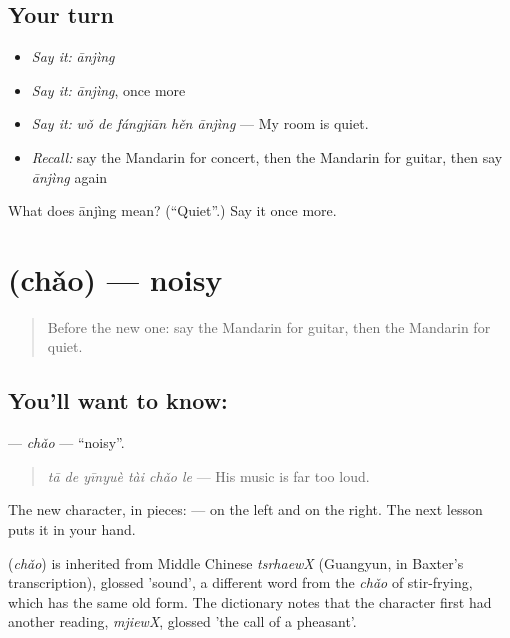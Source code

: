 \subsection*{Your turn}
\begin{itemize}
\raggedright
  \item \emph{Say it:} \emph{ānjìng}
  \item \emph{Say it:} \emph{ānjìng}, once more
  \item \emph{Say it:} \emph{wǒ de fángjiān hěn ānjìng} — My room is quiet.
  \item \emph{Recall:} say the Mandarin for concert, then the Mandarin for guitar, then say \emph{ānjìng} again
\end{itemize}

\begin{tcolorbox}[breakable,colback=teal!4,colframe=teal!35!black,title={Before you move on}]
What does ānjìng mean? (\textquotedblleft{}Quiet\textquotedblright{}.) Say it once more.
\end{tcolorbox}
\section[\texorpdfstring{\zh{吵} (chǎo)}{吵 (chǎo)}]{ (chǎo) — noisy}

\label{lesson:ZH-C129-chao}



\begin{quote}
Before the new one: say the Mandarin for guitar, then the Mandarin for quiet.
\end{quote}

\subsection*{You'll want to know: }
\textbf{} — \emph{chǎo} — \textquotedblleft{}noisy\textquotedblright{}.

\begin{quote}
\textbf{} \emph{tā de yīnyuè tài chǎo le} — His music is far too loud.
\end{quote}

The new character, in pieces:  —  on the left and  on the right. The next lesson puts it in your hand.

\begin{cousinweb}
\textbf{} (\emph{chǎo}) is inherited from Middle Chinese \emph{tsrhaewX} (Guangyun, in Baxter's transcription), glossed 'sound', a different word from the \emph{chǎo} of stir-frying, which has the same old form. The dictionary notes that the character first had another reading, \emph{mjiewX}, glossed 'the call of a pheasant'.
\end{cousinweb}

